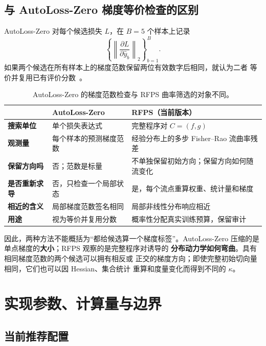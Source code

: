 \documentclass[UTF8,11pt]{ctexart}
\newcommand{\RFPS}{\textsc{RFPS}}
\begin{document}
\subsection{与 AutoLoss-Zero 梯度等价检查的区别}

AutoLoss-Zero 对每个候选损失 \(L\)，在 \(B=5\) 个样本上记录
\[
    \left\{
    \left\|
    \frac{\partial L}{\partial\widehat y_b}
    \right\|_2
    \right\}_{b=1}^{B}.
\]
如果两个候选在所有样本上的梯度范数保留两位有效数字后相同，就认为二者
等价并复用已有评价分数~\cite{Li_2022_CVPR}。

\begin{table}[t]
\centering
\caption{AutoLoss-Zero 的梯度范数检查与 \RFPS{} 曲率筛选的对象不同。}
\label{tab:gradient-difference}
\begin{tabularx}{\linewidth}{>{\bfseries}p{2.8cm}XX}
\toprule
 & AutoLoss-Zero & \RFPS{}（当前版本）\\
\midrule
搜索单位 & 单个损失表达式 & 完整程序对 \(C=(f,g)\)\\
观测量 & 每个样本的预测梯度范数 & 经验分布上的多步 Fisher--Rao 流曲率残差\\
保留方向吗 & 否；范数是标量 & 不单独保留初始方向；保留方向如何随流变化\\
是否重新求导 & 否，只检查一个局部状态 & 是，每个流点重算权重、统计量和梯度\\
相近的含义 & 局部梯度范数签名相同 & 局部非线性分布响应相近\\
用途 & 视为等价并复用分数 & 概率性分配真实训练预算，保留审计\\
\bottomrule
\end{tabularx}
\end{table}

因此，两种方法不能概括为“都给候选算一个梯度标签”。AutoLoss-Zero
压缩的是单点梯度的\textbf{大小}；\RFPS{} 观察的是完整程序对诱导的
\textbf{分布动力学如何弯曲}。具有相同梯度范数的两个候选可以拥有相反或
正交的梯度方向；即使完整初始切向量相同，它们也可以因 Hessian、集合统计
重算和度量变化而得到不同的 \(\kappa\)。

\section{实现参数、计算量与边界}

\subsection{当前推荐配置}
\end{document}
